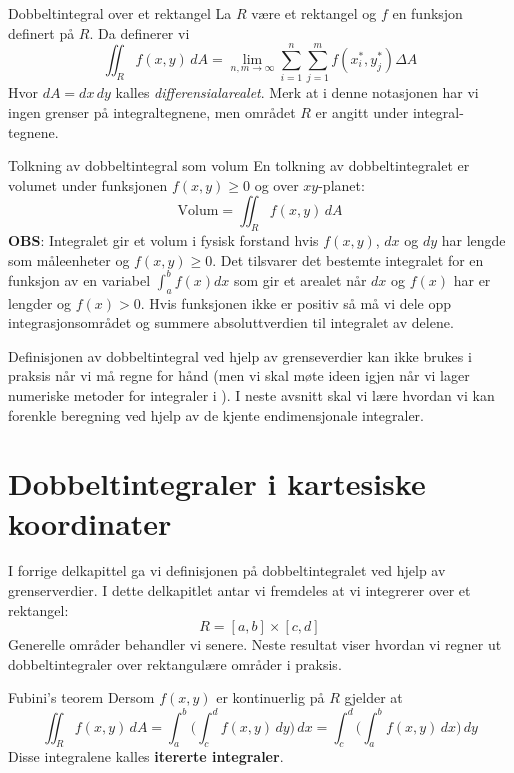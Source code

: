 \begin{defn}{Dobbeltintegral over et rektangel}
La \( R \) være et rektangel og $f$ en funksjon definert på \(R\). Da definerer vi
\[
\iint_R f(x, y) \, dA = \lim_{n, m \to \infty} \sum_{i=1}^n \sum_{j=1}^m f(x_i^*, y_j^*) \Delta A
\]
Hvor \( dA = dx\, dy \) kalles \emph{differensialarealet}. Merk at i denne notasjonen har vi ingen grenser på integraltegnene, men området \( R \) er angitt under integral-tegnene.
\end{defn}

\begin{rem}{Tolkning av dobbeltintegral som volum}
En tolkning av dobbeltintegralet er volumet under funksjonen \( f(x, y) \geq 0\) og over \( xy \)-planet:
\[
\text{Volum} = \iint_R f(x, y) \, dA
\]
\textbf{OBS}:
Integralet gir et volum i fysisk forstand hvis $f(x,y)$, $dx$ og $dy$ har lengde som måleenheter og
$f(x,y)\geq 0$.  Det tilsvarer det bestemte integralet for en funksjon av en variabel $\int_a^b f(x)d x$ som gir et arealet når $dx$ og $f(x)$ har er lengder og $f(x)>0$. Hvis funksjonen ikke er positiv så må vi dele opp integrasjonsområdet og summere absoluttverdien til integralet av delene.  
\end{rem}
Definisjonen av dobbeltintegral ved hjelp av grenseverdier kan ikke brukes i praksis når vi må regne for hånd (men vi skal møte ideen igjen når vi lager numeriske metoder for integraler i ). I neste avsnitt skal vi lære hvordan vi kan forenkle beregning ved hjelp av de kjente endimensjonale integraler.

\section{Dobbeltintegraler i kartesiske koordinater}\label{sect:dobbelint}

I forrige delkapittel ga vi definisjonen på dobbeltintegralet ved hjelp av grenserverdier. I dette delkapitlet antar vi fremdeles at vi integrerer over et rektangel:
\[
R = [a, b] \times [c, d]
\]
Generelle områder behandler vi senere.
Neste resultat viser hvordan vi regner ut dobbeltintegraler over rektangulære områder i praksis.

\begin{thrm}{Fubini's teorem}
Dersom \( f(x, y) \) er kontinuerlig på \( R \) gjelder at
\[
\iint_R f(x, y) \, dA = \int_a^b \bigl(\int_c^d f(x, y) \, dy \bigr) \, dx = \int_c^d \bigl(\int_a^b f(x, y) \, dx \bigr) \, dy
\]
Disse integralene kalles \textbf{itererte integraler}. \label{thm:fubini}
\end{thrm}

